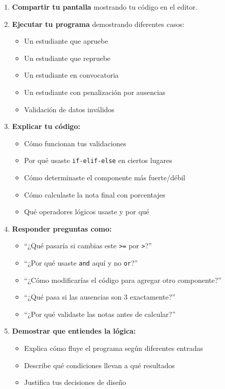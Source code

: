 \documentclass[12pt,a4paper]{article}
\begin{document}
\begin{enumerate}[leftmargin=*]
    \item \textbf{Compartir tu pantalla} mostrando tu código en el editor.
    
    \item \textbf{Ejecutar tu programa} demostrando diferentes casos:
    \begin{itemize}
        \item Un estudiante que apruebe
        \item Un estudiante que repruebe
        \item Un estudiante en convocatoria
        \item Un estudiante con penalización por ausencias
        \item Validación de datos inválidos
    \end{itemize}
    
    \item \textbf{Explicar tu código:}
    \begin{itemize}
        \item Cómo funcionan tus validaciones
        \item Por qué usaste \texttt{if-elif-else} en ciertos lugares
        \item Cómo determinaste el componente más fuerte/débil
        \item Cómo calculaste la nota final con porcentajes
        \item Qué operadores lógicos usaste y por qué
    \end{itemize}
    
    \item \textbf{Responder preguntas como:}
    \begin{itemize}
        \item ``¿Qué pasaría si cambias este \texttt{>=} por \texttt{>}?''
        \item ``¿Por qué usaste \texttt{and} aquí y no \texttt{or}?''
        \item ``¿Cómo modificarías el código para agregar otro componente?''
        \item ``¿Qué pasa si las ausencias son 3 exactamente?''
        \item ``¿Por qué validaste las notas antes de calcular?''
    \end{itemize}
    
    \item \textbf{Demostrar que entiendes la lógica:}
    \begin{itemize}
        \item Explica cómo fluye el programa según diferentes entradas
        \item Describe qué condiciones llevan a qué resultados
        \item Justifica tus decisiones de diseño
    \end{itemize}
\end{enumerate}
\end{document}
